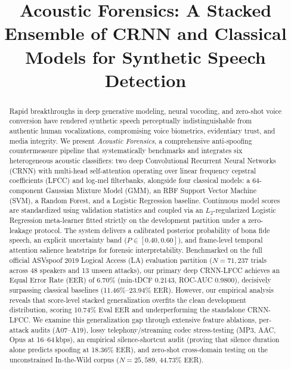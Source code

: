 \documentclass[conference]{IEEEtran}
\begin{document}
\title{Acoustic Forensics: A Stacked Ensemble of CRNN and Classical Models for Synthetic Speech Detection}

\author{
}

\maketitle

\begin{abstract}
Rapid breakthroughs in deep generative modeling, neural vocoding, and zero-shot voice conversion have rendered synthetic speech perceptually indistinguishable from authentic human vocalizations, compromising voice biometrics, evidentiary trust, and media integrity. We present \textit{Acoustic Forensics}, a comprehensive anti-spoofing countermeasure pipeline that systematically benchmarks and integrates six heterogeneous acoustic classifiers: two deep Convolutional Recurrent Neural Networks (CRNN) with multi-head self-attention operating over linear frequency cepstral coefficients (LFCC) and log-mel filterbanks, alongside four classical models: a 64-component Gaussian Mixture Model (GMM), an RBF Support Vector Machine (SVM), a Random Forest, and a Logistic Regression baseline. Continuous model scores are standardized using validation statistics and coupled via an $L_2$-regularized Logistic Regression meta-learner fitted strictly on the development partition under a zero-leakage protocol. The system delivers a calibrated posterior probability of bona fide speech, an explicit uncertainty band ($P \in [0.40, 0.60]$), and frame-level temporal attention salience heatstrips for forensic interpretability. Benchmarked on the full official ASVspoof 2019 Logical Access (LA) evaluation partition ($N = 71{,}237$ trials across 48 speakers and 13 unseen attacks), our primary deep CRNN-LFCC achieves an Equal Error Rate (EER) of 6.70\% (min-tDCF 0.2143, ROC-AUC 0.9800), decisively surpassing classical baselines (11.46\%--23.94\% EER). However, our empirical analysis reveals that score-level stacked generalization overfits the clean development distribution, scoring 10.74\% Eval EER and underperforming the standalone CRNN-LFCC. We examine this generalization gap through extensive feature ablations, per-attack audits (A07--A19), lossy telephony/streaming codec stress-testing (MP3, AAC, Opus at 16--64\,kbps), an empirical silence-shortcut audit (proving that silence duration alone predicts spoofing at 18.36\% EER), and zero-shot cross-domain testing on the unconstrained In-the-Wild corpus ($N = 25{,}589$, 44.73\% EER).
\end{abstract}
\end{document}
